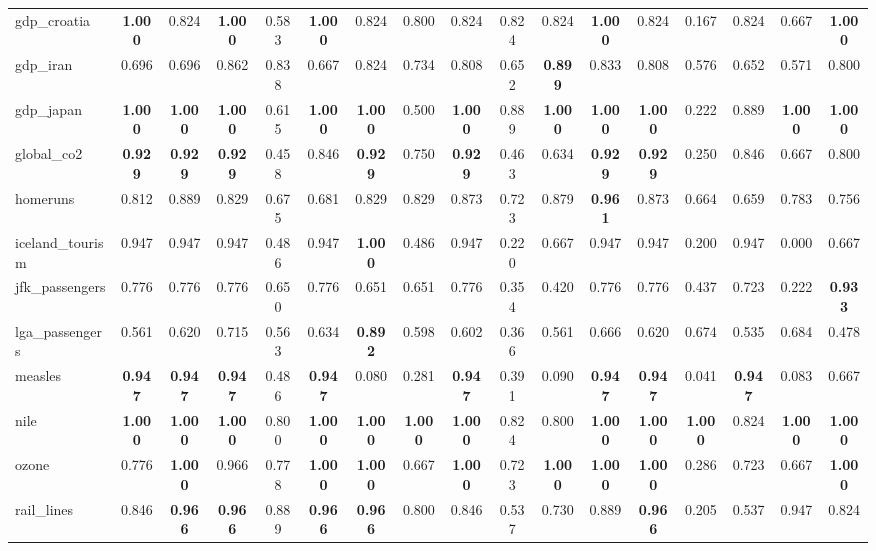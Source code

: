 \documentclass[11pt,a4paper]{article}
\begin{document}
\begin{table}
{\begin{tabular}{lcccccccccccccccc}
gdp\_croatia & \textbf{1.000} & 0.824 & \textbf{1.000} & 0.583 & \textbf{1.000} & 0.824 & 0.800 & 0.824 & 0.824 & 0.824 & \textbf{1.000} & 0.824 & 0.167 & 0.824 & 0.667 & \textbf{1.000} \\
gdp\_iran & 0.696 & 0.696 & 0.862 & 0.838 & 0.667 & 0.824 & 0.734 & 0.808 & 0.652 & \textbf{0.899} & 0.833 & 0.808 & 0.576 & 0.652 & 0.571 & 0.800 \\
gdp\_japan & \textbf{1.000} & \textbf{1.000} & \textbf{1.000} & 0.615 & \textbf{1.000} & \textbf{1.000} & 0.500 & \textbf{1.000} & 0.889 & \textbf{1.000} & \textbf{1.000} & \textbf{1.000} & 0.222 & 0.889 & \textbf{1.000} & \textbf{1.000} \\
global\_co2 & \textbf{0.929} & \textbf{0.929} & \textbf{0.929} & 0.458 & 0.846 & \textbf{0.929} & 0.750 & \textbf{0.929} & 0.463 & 0.634 & \textbf{0.929} & \textbf{0.929} & 0.250 & 0.846 & 0.667 & 0.800 \\
homeruns & 0.812 & 0.889 & 0.829 & 0.675 & 0.681 & 0.829 & 0.829 & 0.873 & 0.723 & 0.879 & \textbf{0.961} & 0.873 & 0.664 & 0.659 & 0.783 & 0.756 \\
iceland\_tourism & 0.947 & 0.947 & 0.947 & 0.486 & 0.947 & \textbf{1.000} & 0.486 & 0.947 & 0.220 & 0.667 & 0.947 & 0.947 & 0.200 & 0.947 & 0.000 & 0.667 \\
jfk\_passengers & 0.776 & 0.776 & 0.776 & 0.650 & 0.776 & 0.651 & 0.651 & 0.776 & 0.354 & 0.420 & 0.776 & 0.776 & 0.437 & 0.723 & 0.222 & \textbf{0.933} \\
lga\_passengers & 0.561 & 0.620 & 0.715 & 0.563 & 0.634 & \textbf{0.892} & 0.598 & 0.602 & 0.366 & 0.561 & 0.666 & 0.620 & 0.674 & 0.535 & 0.684 & 0.478 \\
measles & \textbf{0.947} & \textbf{0.947} & \textbf{0.947} & 0.486 & \textbf{0.947} & 0.080 & 0.281 & \textbf{0.947} & 0.391 & 0.090 & \textbf{0.947} & \textbf{0.947} & 0.041 & \textbf{0.947} & 0.083 & 0.667 \\
nile & \textbf{1.000} & \textbf{1.000} & \textbf{1.000} & 0.800 & \textbf{1.000} & \textbf{1.000} & \textbf{1.000} & \textbf{1.000} & 0.824 & 0.800 & \textbf{1.000} & \textbf{1.000} & \textbf{1.000} & 0.824 & \textbf{1.000} & \textbf{1.000} \\
ozone & 0.776 & \textbf{1.000} & 0.966 & 0.778 & \textbf{1.000} & \textbf{1.000} & 0.667 & \textbf{1.000} & 0.723 & \textbf{1.000} & \textbf{1.000} & \textbf{1.000} & 0.286 & 0.723 & 0.667 & \textbf{1.000} \\
rail\_lines & 0.846 & \textbf{0.966} & \textbf{0.966} & 0.889 & \textbf{0.966} & \textbf{0.966} & 0.800 & 0.846 & 0.537 & 0.730 & 0.889 & \textbf{0.966} & 0.205 & 0.537 & 0.947 & 0.824 \\

\end{tabular}}
\end{table}
\end{document}
